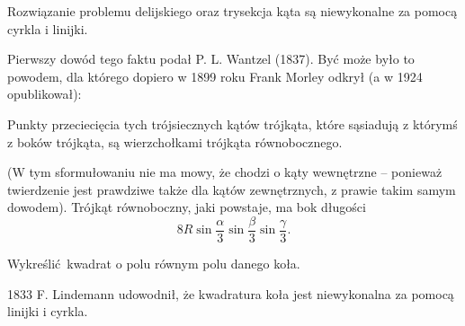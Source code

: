 \begin{proposition}
    Rozwiązanie problemu delijskiego oraz trysekcja kąta są niewykonalne za pomocą cyrkla i linijki.
\end{proposition}

Pierwszy dowód tego faktu podał P. L. Wantzel (1837).
Być może było to powodem, dla którego dopiero w 1899 roku Frank Morley odkrył (a w 1924 opublikował):

\begin{theorem}[Morleya]
    Punkty przeciecięcia tych trójsiecznych kątów trójkąta, które sąsiadują z którymś z boków trójkąta, są wierzchołkami trójkąta równobocznego.
\end{theorem}

(W tym sformułowaniu nie ma mowy, że chodzi o kąty wewnętrzne -- ponieważ twierdzenie jest prawdziwe także dla kątów zewnętrznych, z prawie takim samym dowodem).
Trójkąt równoboczny, jaki powstaje, ma bok długości
\begin{equation}
    8 R \sin \frac \alpha 3 \sin \frac \beta 3 \sin \frac \gamma 3.
\end{equation}

\begin{problem}
    Wykreślić kwadrat o polu równym polu danego koła.
\end{problem}

1833 F. Lindemann udowodnił, że kwadratura koła jest niewykonalna za pomocą linijki i cyrkla.



